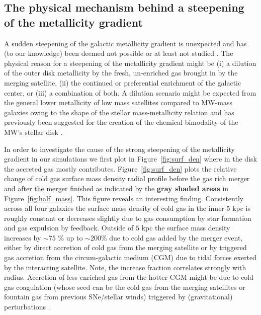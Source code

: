 \documentclass[useAMS,usenatbib]{mnras}
\begin{document}
\subsection{The physical mechanism behind a steepening of the metallicity gradient}
\label{sec:steepening}

A sudden steepening of the galactic metallicity gradient is unexpected and has (to our knowledge) been deemed not possible or at least not studied \citep[e.g.][for an extensive study]{Chiappini2001}. The physical reason for a steepening of the metallicity gradient might be (i) a dilution of the outer disk metallicity by the fresh, un-enriched gas brought in by the merging satellite, (ii) the continued or preferential enrichment of the galactic center, or (iii) a combination of both. A dilution scenario might be expected from the general lower metallicity of low mass satellites compared to MW-mass galaxies owing to the shape of the stellar mass-metallicity relation and has previously been suggested for the creation of the chemical bimodality of the MW's stellar disk \citep[e.g.][]{Chiappini1997, Spitoni2019, Buck2020}.

In order to investigate the cause of the strong steepening of the metallicity gradient in our simulations we first plot in Figure~\ref{fig:surf_den} where in the disk the accreted gas mostly contributes. Figure~\ref{fig:surf_den} plots the relative change of cold gas surface mass density radial profile before the gas rich merger and after the merger finished as indicated by the \textbf{gray shaded areas} in Figure~\ref{fig:half_mass}. This figure reveals an interesting finding. Consistently across all four galaxies the surface mass density of cold gas in the inner $5$ kpc is roughly constant or decreases slightly due to gas consumption by star formation and gas expulsion by feedback. Outside of $5$ kpc the surface mass density increases by $\sim75$ \% up to $\sim200$\% due to cold gas added by the merger event, either by direct accretion of cold gas from the merging satellite or by triggered gas accretion from the circum-galactic medium (CGM) due to tidal forces exerted by the interacting satellite. Note, the increase fraction correlates strongly with radius. Accretion of less enriched gas from the hotter CGM might be due to cold gas coagulation (whose seed can be the cold gas from the merging satellites or fountain gas \citep[e.g.][]{Armillotta2016,Sparre2020} from previous SNe/stellar winds) triggered by (gravitational) perturbations \citep[e.g.][]{Gronke2022}.
\end{document}
